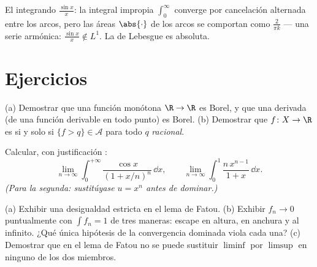 \begin{omfigure}

{\small El integrando $\frac{\sin x}x$: la integral impropia
$\int_0^\infty$ converge por cancelación alternada entre los arcos, pero
las áreas $\abs{\cdot}$ de los arcos se comportan como $\frac2{\pi k}$
--- una serie armónica: $\frac{\sin x}x
\notin L^1$. La  de Lebesgue
es  absoluta.}
\end{omfigure}

\section{Ejercicios}

\begin{exercise}[$\star$]\label{exo:b3:lebesgue:1}
(a) Demostrar que una función monótona $\R \to \R$ es
 Borel, y que una derivada
(de una función derivable en todo punto) es
 Borel. (b) Demostrar que
$f \colon X \to \R$ es  si y
solo si $\{f > q\}
\in \mathcal A$ para todo $q$ \emph{racional}.
\end{exercise}

\begin{exercise}[$\star$]\label{exo:b3:lebesgue:2}
Calcular, con justificación :
\[
\lim_{n\to\infty}\int_0^{+\infty}
\frac{\cos x}{(1 + x/n)^{n}}\,\dd x,
\qquad
\lim_{n\to\infty}\int_0^1 \frac{n\,x^{n-1}}{1 + x}\,\dd x .
\]
\emph{(Para la segunda: sustitúyase $u = x^n$ antes de dominar.)}
\end{exercise}

\begin{exercise}[$\star\star$]\label{exo:b3:lebesgue:3}
(a) Exhibir una desigualdad estricta en el lema de Fatou. (b) Exhibir
$f_n \to 0$ puntualmente con $\int f_n = 1$ de tres maneras: escape en
altura, en anchura y al infinito. ¿Qué única hipótesis de la
convergencia dominada viola cada una? (c) Demostrar que en el lema de
Fatou no se puede sustituir $\liminf$ por $\limsup$ en ninguno de los
dos miembros.
\end{exercise}

